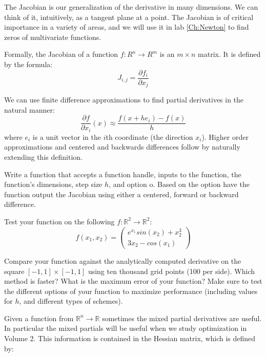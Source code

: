 

The Jacobian is our generalization of the derivative in many dimensions. We can think of it, intuitively, as a tangent plane at a point. The Jacobian is of critical importance in a variety of areas, and we will use it in lab \ref{Ch:Newton} to find zeros of multivariate functions.

Formally, the Jacobian of a function $f:R^n \rightarrow R^m$ is an $m \times n$ matrix. It is defined by the formula:
\[
J_{i,j} = \frac{\partial f_i}{\partial x_j}
\]

We can use finite difference approximations to find partial derivatives in the natural manner:
\[
\frac{\partial f}{\partial x_i} (x) \approx \frac{f(x+h e_i)-f(x)}{h}
\]
where $e_i$ is a unit vector in the $i$th coordinate (the direction $x_i$). Higher order approximations and centered and backwards differences follow by naturally extending this definition.

\begin{problem}
Write a function  that accepts a function handle, inputs to the function, the function's dimensions, step size $h$, and option o. Based on the option have the function output the Jacobian using either a centered, forward or backward difference.

Test your function on the following $f: \mathbb{R}^2 \to \mathbb{R}^2$:
\[
f(x_1, x_2) = 
\begin{pmatrix}
e^{x_1} sin(x_2) + x_2^3 \\
3x_2 - cos(x_1)
\end{pmatrix}
\] 

Compare your  function against the analytically computed derivative on the square $[-1,1]\times[-1,1]$ using ten thousand grid points (100 per side). Which method is faster? What is the maximum error of your function? Make sure to test the different options of your function to maximize performance (including values for $h$, and different types of schemes).
\end{problem}

Given a function from $\mathbb{R}^n \to \mathbb{R}$ sometimes the mixed partial derivatives are useful. In particular the mixed partials will be useful when we study optimization in Volume 2. This information is contained in the Hessian matrix, which is defined by:

